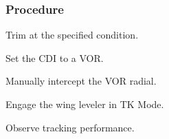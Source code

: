 % 
% 
%
 \subsubsection*{Procedure}
 \begin{compactenum}
    \item Trim at the specified condition.
    \item Set the CDI to a VOR.
    \item Manually intercept the VOR radial.
    \item Engage the wing leveler in TK Mode.
    \item Observe tracking performance.
    \end{compactenum}
